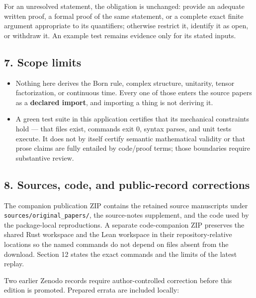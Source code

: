 \documentclass[
  11pt,
]{article}
\providecommand{\tightlist}{%
  \setlength{\itemsep}{0pt}\setlength{\parskip}{0pt}}
\begin{document}
For an unresolved statement, the obligation is unchanged: provide an
adequate written proof, a formal proof of the same statement, or a
complete exact finite argument appropriate to its quantifiers; otherwise
restrict it, identify it as open, or withdraw it. An example test
remains evidence only for its stated inputs.

\subsection{7. Scope limits}\label{scope-limits}

\begin{itemize}
\tightlist
\item
  Nothing here derives the Born rule, complex structure, unitarity,
  tensor factorization, or continuous time. Every one of those enters
  the source papers as a \textbf{declared import}, and importing a thing
  is not deriving it.
\item
  A green test suite in this application certifies that its mechanical
  constraints hold --- that files exist, commands exit 0, syntax parses,
  and unit tests execute. It does not by itself certify semantic
  mathematical validity or that prose claims are fully entailed by
  code\allowbreak{}/\allowbreak{}proof terms; those boundaries require
  substantive review.
\end{itemize}

\subsection{8. Sources, code, and public-record
corrections}\label{sources-code-and-public-record-corrections}

The companion publication ZIP contains the retained source manuscripts
under
\texttt{s\allowbreak{}o\allowbreak{}u\allowbreak{}r\allowbreak{}c\allowbreak{}e\allowbreak{}s\allowbreak{}/\allowbreak{}o\allowbreak{}r\allowbreak{}i\allowbreak{}g\allowbreak{}i\allowbreak{}n\allowbreak{}a\allowbreak{}l\allowbreak{}\_\allowbreak{}p\allowbreak{}a\allowbreak{}p\allowbreak{}e\allowbreak{}r\allowbreak{}s\allowbreak{}/},
the source-notes supplement, and the code used by the package-local
reproductions. A separate code-companion ZIP preserves the shared Rust
workspace and the Lean workspace in their repository-relative locations
so the named commands do not depend on files absent from the download.
Section 12 states the exact commands and the limits of the latest
replay.

Two earlier Zenodo records require author-controlled correction before
this edition is promoted. Prepared errata are included locally:
\end{document}
